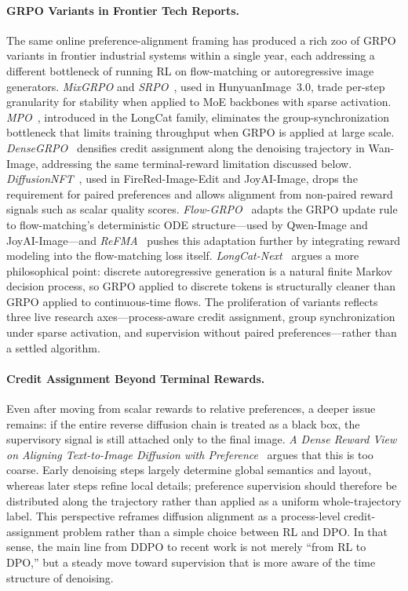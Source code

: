 \paragraph{GRPO Variants in Frontier Tech Reports.}
{The same online preference-alignment framing has produced a rich zoo of GRPO variants in frontier industrial systems within a single year, each addressing a different bottleneck of running RL on flow-matching or autoregressive image generators. \textit{MixGRPO} and \textit{SRPO}~\citep{cao2025hunyuanimage}, used in HunyuanImage~3.0, trade per-step granularity for stability when applied to MoE backbones with sparse activation. \textit{MPO}~\citep{team2025longcat}, introduced in the LongCat family, eliminates the group-synchronization bottleneck that limits training throughput when GRPO is applied at large scale. \textit{DenseGRPO}~\citep{mao2026wan} densifies credit assignment along the denoising trajectory in Wan-Image, addressing the same terminal-reward limitation discussed below. \textit{DiffusionNFT}~\citep{team2026firered,jdjoyaiimage}, used in FireRed-Image-Edit and JoyAI-Image, drops the requirement for paired preferences and allows alignment from non-paired reward signals such as scalar quality scores. \textit{Flow-GRPO}~\citep{wu2025qwen,jdjoyaiimage} adapts the GRPO update rule to flow-matching's deterministic ODE structure---used by Qwen-Image and JoyAI-Image---and \textit{ReFMA}~\citep{mao2026wan} pushes this adaptation further by integrating reward modeling into the flow-matching loss itself. \textit{LongCat-Next}~\citep{team2026longcat} argues a more philosophical point: discrete autoregressive generation is a natural finite Markov decision process, so GRPO applied to discrete tokens is structurally cleaner than GRPO applied to continuous-time flows. The proliferation of variants reflects three live research axes---process-aware credit assignment, group synchronization under sparse activation, and supervision without paired preferences---rather than a settled algorithm.}

\paragraph{Credit Assignment Beyond Terminal Rewards.}
Even after moving from scalar rewards to relative preferences, a deeper issue remains: if the entire reverse diffusion chain is treated as a black box, the supervisory signal is still attached only to the final image. \textit{A Dense Reward View on Aligning Text-to-Image Diffusion with Preference}~\citep{yang2024dense} argues that this is too coarse. Early denoising steps largely determine global semantics and layout, whereas later steps refine local details; preference supervision should therefore be distributed along the trajectory rather than applied as a uniform whole-trajectory label. This perspective reframes diffusion alignment as a process-level credit-assignment problem rather than a simple choice between RL and DPO. In that sense, the main line from DDPO to recent work is not merely ``from RL to DPO,'' but a steady move toward supervision that is more aware of the time structure of denoising.

